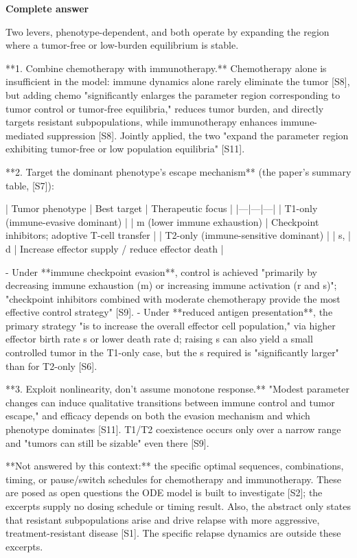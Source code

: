 \documentclass[10pt]{article}
\begin{document}
\textbf{Complete answer}
\begin{AnswerText}
Two levers, phenotype-dependent, and both operate by expanding the region where a tumor-free or low-burden equilibrium is stable.

**1. Combine chemotherapy with immunotherapy.** Chemotherapy alone is insufficient in the model: immune dynamics alone rarely eliminate the tumor [S8], but adding chemo "significantly enlarges the parameter region corresponding to tumor control or tumor-free equilibria," reduces tumor burden, and directly targets resistant subpopulations, while immunotherapy enhances immune-mediated suppression [S8]. Jointly applied, the two "expand the parameter region exhibiting tumor-free or low population equilibria" [S11].

**2. Target the dominant phenotype's escape mechanism** (the paper's summary table, [S7]):

| Tumor phenotype | Best target | Therapeutic focus |
|---|---|---|
| T1-only (immune-evasive dominant) | | m (lower immune exhaustion) | Checkpoint inhibitors; adoptive T-cell transfer |
| T2-only (immune-sensitive dominant) | | s, | d | Increase effector supply / reduce effector death |

- Under **immune checkpoint evasion**, control is achieved "primarily by decreasing immune exhaustion (m) or increasing immune activation (r and s)"; "checkpoint inhibitors combined with moderate chemotherapy provide the most effective control strategy" [S9].
- Under **reduced antigen presentation**, the primary strategy "is to increase the overall effector cell population," via higher effector birth rate s or lower death rate d; raising s can also yield a small controlled tumor in the T1-only case, but the s required is "significantly larger" than for T2-only [S6].

**3. Exploit nonlinearity, don't assume monotone response.** "Modest parameter changes can induce qualitative transitions between immune control and tumor escape," and efficacy depends on both the evasion mechanism and which phenotype dominates [S11]. T1/T2 coexistence occurs only over a narrow range and "tumors can still be sizable" even there [S9].

**Not answered by this context:** the specific optimal sequences, combinations, timing, or pause/switch schedules for chemotherapy and immunotherapy. These are posed as open questions the ODE model is built to investigate [S2]; the excerpts supply no dosing schedule or timing result. Also, the abstract only states that resistant subpopulations arise and drive relapse with more aggressive, treatment-resistant disease [S1]. The specific relapse dynamics are outside these excerpts.
\end{AnswerText}
\end{document}
